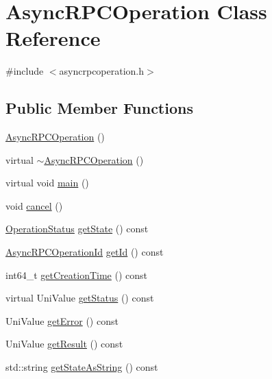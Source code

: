 \hypertarget{class_async_r_p_c_operation}{}\section{Async\+R\+P\+C\+Operation Class Reference}
\label{class_async_r_p_c_operation}


{\ttfamily \#include $<$asyncrpcoperation.\+h$>$}

\subsection*{Public Member Functions}
\begin{DoxyCompactItemize}
\item 
\mbox{\hyperlink{class_async_r_p_c_operation_a46579a5f8045b6301a4354d578877cc8}{Async\+R\+P\+C\+Operation}} ()
\item 
virtual \mbox{\hyperlink{class_async_r_p_c_operation_a5e5bc22f608ee116e5bd80aed36d77fd}{$\sim$\+Async\+R\+P\+C\+Operation}} ()
\item 
virtual void \mbox{\hyperlink{class_async_r_p_c_operation_a37b00fb2684a303d04109b7e9b95ed36}{main}} ()
\item 
void \mbox{\hyperlink{class_async_r_p_c_operation_ac381d872b2673a45c3cfeb35f6e008aa}{cancel}} ()
\item 
\mbox{\hyperlink{asyncrpcoperation_8h_ac36eba6558c325a3ae9853d551326ff6}{Operation\+Status}} \mbox{\hyperlink{class_async_r_p_c_operation_a5dc5eb2a358d01926b7c5c4f6cf29b3e}{get\+State}} () const
\item 
\mbox{\hyperlink{asyncrpcoperation_8h_a1fb3337bad8503e6f6823aa1bcd7191c}{Async\+R\+P\+C\+Operation\+Id}} \mbox{\hyperlink{class_async_r_p_c_operation_ab146889334b2c769abcae4227e51935a}{get\+Id}} () const
\item 
int64\+\_\+t \mbox{\hyperlink{class_async_r_p_c_operation_ae7baefce223a953ef027ac064c2889d9}{get\+Creation\+Time}} () const
\item 
virtual Uni\+Value \mbox{\hyperlink{class_async_r_p_c_operation_a5e448738dc1ee9504602cda249e992a9}{get\+Status}} () const
\item 
Uni\+Value \mbox{\hyperlink{class_async_r_p_c_operation_afa40d2c45199a150cd428ce9dddef2d6}{get\+Error}} () const
\item 
Uni\+Value \mbox{\hyperlink{class_async_r_p_c_operation_a9d55ed3338361eb7cec39c1a09dd7302}{get\+Result}} () const
\item 
std\+::string \mbox{\hyperlink{class_async_r_p_c_operation_a03b6422d357c20f8d635fb2ddcf05c7c}{get\+State\+As\+String}} () const

\end{DoxyCompactItemize}
